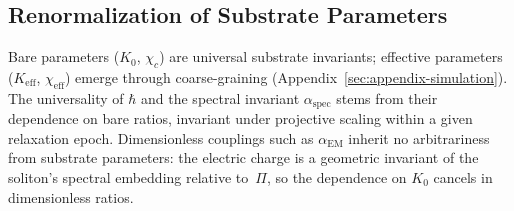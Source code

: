 \subsection{Renormalization of Substrate Parameters}
\label{subsec:renormalization}

Bare parameters ($K_0$, $\chi_c$) are universal substrate invariants;
effective parameters ($K_{\mathrm{eff}}$, $\chi_{\mathrm{eff}}$)
emerge through coarse-graining
(Appendix~\ref{sec:appendix-simulation}).
The universality of $\hbar$ and the spectral invariant
$\alpha_{\mathrm{spec}}$ stems from their dependence on bare ratios,
invariant under projective scaling within a given relaxation epoch.
Dimensionless couplings such as $\alpha_{\mathrm{EM}}$ inherit no
arbitrariness from substrate parameters: the electric charge is a
geometric invariant of the soliton's spectral embedding relative
to~$\Pi$, so the dependence on $K_0$ cancels in dimensionless ratios.
